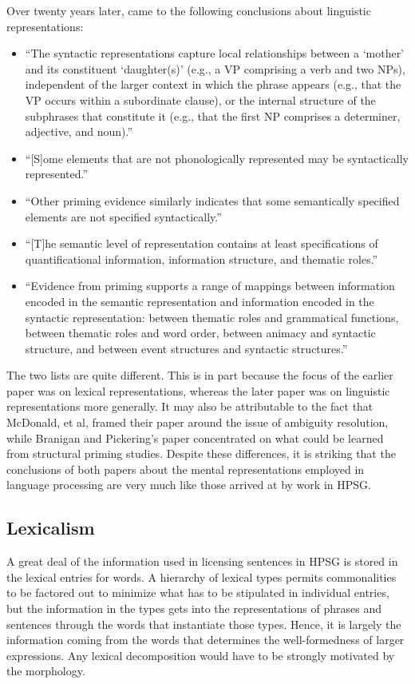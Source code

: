 \documentclass[a4paper]{article}
\begin{document}
Over twenty years later, \citet{BraniganPickering2017} came to the following conclusions about linguistic representations:
\begin{itemize}
\item ``The syntactic representations capture local relationships
between a `mother' and its constituent `daughter(s)' (e.g.,
a VP comprising a verb and two NPs), independent of the
larger context in which the phrase appears (e.g., that the VP
occurs within a subordinate clause), or the internal structure
of the subphrases that constitute it (e.g., that the
first NP comprises a determiner, adjective, and noun).''
\item ``[S]ome elements that are not phonologically represented may
be syntactically represented.''
\item ``Other priming evidence similarly indicates that some
semantically specified elements are not specified syntactically.''
\item ``[T]he semantic level of representation
contains at least specifications of quantificational information,
information structure, and thematic roles.''
\item ``Evidence
from priming supports a range of mappings between information encoded in the semantic representation and information encoded in the syntactic representation: between
thematic roles and grammatical functions, between thematic roles and word order, between animacy and syntactic
structure, and between event structures and syntactic
structures.''
\end{itemize}
The two lists are quite different.  This is in part because the focus of the earlier paper was on lexical representations, whereas the later paper was on linguistic representations more generally.  It may also be attributable to the fact that McDonald, et al, framed their paper around the issue of ambiguity resolution, while Branigan and Pickering's paper concentrated on what could be learned from structural priming studies.  Despite these differences, it is striking that the conclusions of both papers about the mental representations employed in language processing are very much like those arrived at by work in HPSG.

\subsection{Lexicalism}

A great deal of the information used in licensing sentences in HPSG is stored in the lexical entries for words.  A hierarchy of lexical types permits commonalities to be factored out to minimize what has to be stipulated in individual entries, but the information in the types gets into the representations of phrases and sentences through the words that instantiate those types. Hence, it is largely the information coming from the words that determines the well-formedness of larger expressions.  Any lexical decomposition would have to be strongly motivated by the morphology.
\end{document}

